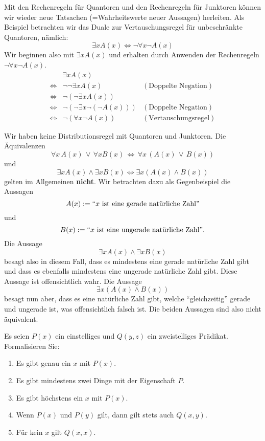 \begin{bsp}
 Mit den Rechenregeln für Quantoren und den Rechenregeln für Junktoren können wir wieder neue Tatsachen (=Wahrheitswerte neuer Aussagen) herleiten. Als Beispiel betrachten wir das Duale zur Vertauschungsregel für unbeschränkte Quantoren, nämlich:
\[
 \exists xA(x)\Leftrightarrow \neg \forall x\neg A(x)
\]
Wir beginnen also mit $\exists xA(x)$ und erhalten durch Anwenden der Rechenregeln $\neg \forall x\neg A(x)$.
\begin{align*}
 &\exists xA(x)\\
\Leftrightarrow&\neg\neg\exists xA(x)&(\text{Doppelte Negation}) \\
\Leftrightarrow&\neg(\neg\exists x A(x))\\
\Leftrightarrow&\neg(\neg\exists x \neg(\neg A(x)))&(\text{Doppelte Negation})\\
\Leftrightarrow&\neg(\forall x\neg A(x))&(\text{Vertauschungsregel})
\end{align*}
\end{bsp}

\begin{wrn}
 Wir haben keine Distributionsregel mit Quantoren und Junktoren. Die Äquivalenzen
\[
\forall x\, A(x)\,\lor\,\forall x B(x)\,\Leftrightarrow\, \forall x\,(A(x)\,\lor\, B(x))
\]
und
\[
 \exists x A(x)\wedge\exists x B(x)\Leftrightarrow \exists x (A(x)\wedge B(x))
\]
gelten im Allgemeinen \textbf{nicht}. Wir betrachten dazu als Gegenbeispiel die Aussagen
\[
A(x):=``x \text{ ist eine gerade natürliche Zahl''}
\]
und
\[
B(x):=``x\text{ ist eine ungerade natürliche Zahl''}.
\]
Die Aussage
\[
 \exists x A(x)\wedge\exists x B(x)
\]
besagt also in diesem Fall, dass es mindestens eine gerade natürliche Zahl gibt und dass es ebenfalls mindestens eine ungerade natürliche Zahl gibt. Diese Aussage ist offensichtlich wahr. Die Aussage
\[
  \exists x (A(x)\wedge B(x))
\]
besagt nun aber, dass es eine natürliche Zahl gibt, welche ``gleichzeitig'' gerade und ungerade ist, was offensichtlich falsch ist. Die beiden Aussagen sind also nicht äquivalent.
\end{wrn}

\begin{ueb}
  Es seien $P(x)$ ein einstelliges und $Q(y,z)$ ein zweistelliges Prädikat. Formalisieren Sie:
  \begin{enumerate}
      \item Es gibt genau ein $x$ mit $P(x)$.
      \item Es gibt mindestens zwei Dinge mit der Eigenschaft $P$.
      \item Es gibt höchstens ein $x$ mit $P(x)$.
      \item Wenn $P(x)$ und $P(y)$ gilt, dann gilt stets auch $Q(x,y)$.
      \item Für kein $x$ gilt $Q(x,x)$.
  \end{enumerate}
\end{ueb}

